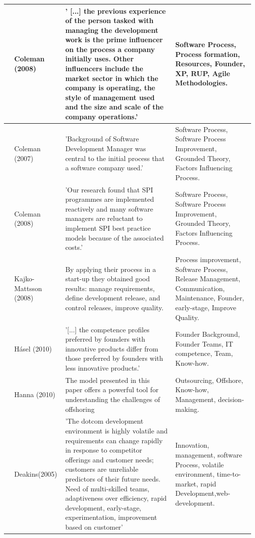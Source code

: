 \documentclass[final,5p,times,twocolumn]{elsarticle}
\begin{document}
\begin{longtable}{|p{0.2in}|p{0.8in}|p{2.5in}|p{1.4in}|}
\cite{Coleman2008} & Coleman (2008) & ' [...] the previous experience of the person tasked with managing the development work is the prime influencer on the process a company initially uses. Other influencers include the market sector in which the company is operating, the style of management used and the size and scale of the company operations.' & Software Process, Process formation, Resources,  Founder, XP, RUP, Agile Methodologies.  \\ \hline  
\cite{Coleman2007} & Coleman (2007) & 'Background of Software Development Manager was central to the initial process that a software company used.' & Software Process, Software Process Improvement, Grounded Theory, Factors Influencing Process.  \\ \hline 
\cite{Coleman2008a} & Coleman (2008) & 'Our research found that SPI programmes are implemented reactively and many software managers are reluctant to implement SPI best practice models because of the associated costs.' & Software Process, Software Process Improvement, Grounded Theory, Factors Influencing Process.  \\ \hline 
\cite{Kajko-Mattsson2008} & Kajko-Mattsson (2008) & By applying their process in a start-up they obtained good results: manage requirements, define development release, and control releases, improve quality. & Process improvement, Software Process, Release Management, Communication, Maintenance, Founder, early-stage, Improve Quality. \\ \hline 
\cite{Hasel2010} & H\'{a}sel  (2010) & '[...] the competence profiles preferred by founders with innovative products differ from those preferred by founders with less innovative products.' & Founder Background, Founder Teams, IT competence, Team, Know-how. \\ \hline 
\cite{Hanna2010} & Hanna (2010) & The model presented in this paper offers a powerful tool for understanding the challenges of offshoring & Outsourcing, Offshore, Know-how, Management, decision-making. \\ \hline 
\cite{Deakins2005} & Deakins(2005) & 'The dotcom development environment is highly volatile and requirements can change rapidly in response to competitor offerings and customer needs; customers are unreliable predictors of their future needs. Need of multi-skilled teams, adaptiveness over efficiency, rapid development, early-stage, experimentation, improvement based on customer' & Innovation, management, software Process, volatile environment, time-to-market, rapid Development,web-development. \\ \hline 

\end{longtable}
\end{document}
